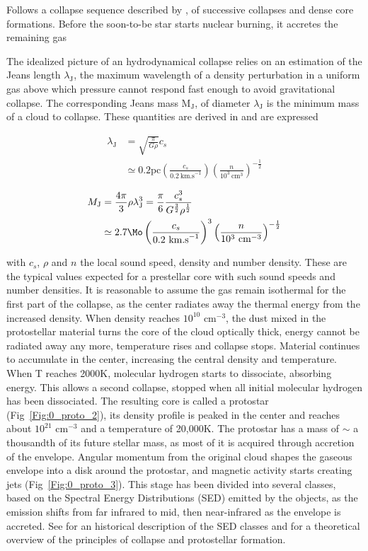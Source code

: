 Follows a collapse sequence described by \cite{Larson1969}, of successive collapses and dense core formations. Before the soon-to-be star starts nuclear burning, it accretes the remaining gas 

The idealized picture of an hydrodynamical collapse relies on an estimation of the Jeans length $\lambda_\textrm{J}$, the maximum wavelength of a density perturbation in a uniform gas above which pressure cannot respond fast enough to avoid gravitational collapse. The corresponding Jeans mass M$_\textrm{J}$, of diameter $\lambda_\textrm{J}$ is the minimum mass of a cloud to collapse. These quantities are derived in \cite{BT} and are expressed

\begin{align}
\lambda_\textrm{J} & = \sqrt{\frac{\pi}{G \rho}} c_s \\
	 & \simeq  0.2 \textrm{pc} \left( \frac{c_s}{0.2 ~ \textrm{km.s}^{-1}} \right) \left( \frac{n}{10^3 ~ \textrm{cm}^3} \right)^{-\frac{1}{2}}
\end{align}

\begin{align}
M_\textrm{J} &=  \frac{4 \pi}{3} \rho  \lambda_\textrm{J} ^3 =    \frac{\pi}{6}  \frac{c_s^3}{G^\frac{3}{2}\rho^\frac{1}{2}} \\
 & \simeq  2.7 \Mo \left( \frac{c_s}{0.2 ~ \textrm{km.s}^{-1}} \right)^3 \left( \frac{n}{10^3 ~ \textrm{cm}^{-3}} \right)^{-\frac{1}{2}}
\end{align}

with $c_s$, $\rho$ and $n$ the local sound speed, density and number density. These are the typical values expected for a prestellar core with such sound speeds and number densities. It is reasonable to assume the gas remain isothermal for the first part of the collapse, as the center radiates away the thermal energy from the increased density. When density reaches $10^{10}$ cm$^{-3}$, the dust mixed in the protostellar material turns the core of the cloud optically thick, energy cannot be radiated away any more, temperature rises and collapse stops. Material continues to accumulate in the center, increasing the central density and temperature. When T reaches 2000K, molecular hydrogen starts to dissociate, absorbing energy. This allows a second collapse, stopped when all initial molecular hydrogen has been dissociated. The resulting core is called a protostar (Fig~\ref{Fig:0_proto_2}), its density profile is peaked in the center and reaches about $10^{21}$ cm$^{-3}$ and a temperature of 20,000K. The protostar has a mass of $\sim$ a thousandth of its future stellar mass, as most of it is acquired through accretion of the envelope. Angular momentum from the original cloud shapes the gaseous envelope into a disk around the protostar, and magnetic activity starts creating jets (Fig~\ref{Fig:0_proto_3}). This stage has been divided into several classes, based on the Spectral Energy Distributions (SED) emitted by the objects, as the emission shifts from far infrared to mid, then near-infrared as the envelope is accreted. See \cite{Evans2009} for an historical description of the SED classes and \cite{Larson1969} for a theoretical overview of the principles of collapse and protostellar formation. 



